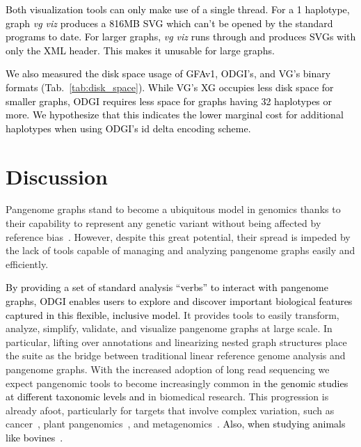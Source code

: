 \documentclass{bioinfo}
\newcommand{\REVIEWED}[1]{{\textcolor{Black}{#1}}}
\begin{document}
\REVIEWED{Both visualization tools can only make use of a single thread.
For a 1 haplotype, graph \textit{vg viz} produces a 816MB SVG which can't be opened by the standard programs to date.
For larger graphs, \textit{vg viz} runs through and produces SVGs with only the XML header. This makes it unusable for large graphs.}

\REVIEWED{We also measured the disk space usage of GFAv1, ODGI's, and VG's binary formats (Tab.~\ref{tab:disk_space}).
While VG's XG occupies less disk space for smaller graphs, ODGI requires less space for graphs having 32 haplotypes or more.
We hypothesize that this indicates the lower marginal cost for additional haplotypes when using ODGI's id delta encoding scheme. }




%




\section{Discussion}
Pangenome graphs stand to become a ubiquitous model in genomics thanks to their capability to represent any genetic variant without being affected by reference bias~\citep{Eizenga_2020}.
However, despite this great potential, their spread is impeded by the lack of tools capable of managing and analyzing pangenome graphs easily and efficiently.

\REVIEWED{By providing a set of standard analysis ``verbs'' to interact with pangenome graphs, ODGI enables users to explore and discover important biological features captured in this flexible, inclusive model.}
It provides tools to easily transform, analyze, simplify, validate, and visualize pangenome graphs at large scale.
In particular, lifting over annotations and linearizing nested graph structures place the suite as the bridge between traditional linear reference genome analysis and pangenome graphs.
With the increased adoption of long read sequencing we expect pangenomic tools to become increasingly common in \REVIEWED{the genomic studies at different taxonomic levels and} in biomedical research.
This progression is already afoot, particularly for targets that involve complex variation, such as cancer\REVIEWED{~\citep{CompPan2016}}, plant pangenomics\REVIEWED{~\citep{Bayer2020, Liu2020, Qin2021, Li2022, Bayer2022}}, and metagenomics\REVIEWED{~\citep{Zhong2021}}. \REVIEWED{Also, when studying animals like bovines~\citep{Leonard2021, Talenti2022, BPC}.}
\end{document}
